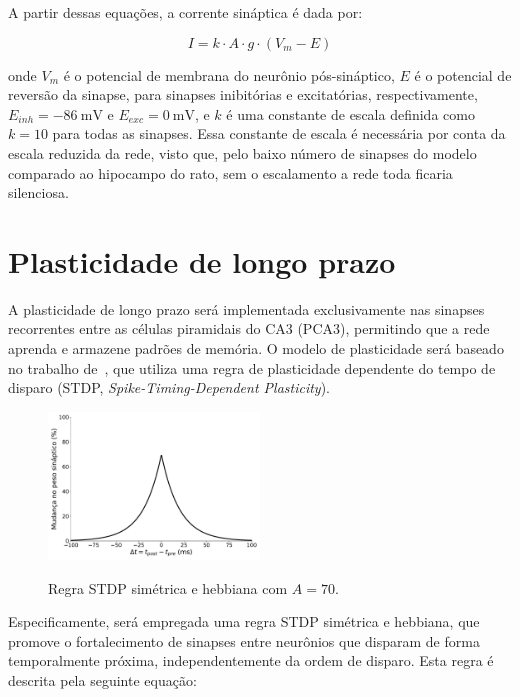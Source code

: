 A partir dessas equações, a corrente sináptica é dada por:

\begin{equation}
    \label{eq_tsodyks_I}
    I = k \cdot A \cdot g \cdot (V_m - E)
\end{equation}

onde $V_m$ é o potencial de membrana do neurônio pós-sináptico, $E$ é o potencial de reversão da sinapse, para sinapses
inibitórias e excitatórias, respectivamente, $E_{inh} = \SI{-86}{\milli\volt}$ e $E_{exc} = \SI{0}{\milli\volt}$, e $k$
é uma constante de escala definida como $k = 10$ para todas as sinapses. Essa constante de escala é necessária por conta
da escala reduzida da rede, visto que, pelo baixo número de sinapses do modelo comparado ao hipocampo do rato, sem o 
escalamento a rede toda ficaria silenciosa.





\section{Plasticidade de longo prazo}

A plasticidade de longo prazo será implementada exclusivamente nas sinapses recorrentes entre as células piramidais do CA3 (PCA3),
permitindo que a rede aprenda e armazene padrões de memória. O modelo de plasticidade será baseado no trabalho
de~, que utiliza uma regra de plasticidade dependente do tempo de disparo (STDP,
\textit{Spike-Timing-Dependent Plasticity}).

\begin{figure}[H]
    \centering
    \caption{Regra STDP simétrica e hebbiana com $A = 70$.}
    \includegraphics[width=0.5\textwidth]{figuras/symmetric_stdp}
    \label{fig:symmetric_stdp}
\end{figure}

Especificamente, será empregada uma regra STDP simétrica e hebbiana, que promove o fortalecimento de sinapses entre neurônios que
disparam de forma temporalmente próxima, independentemente da ordem de disparo. Esta regra é descrita pela seguinte equação: 

